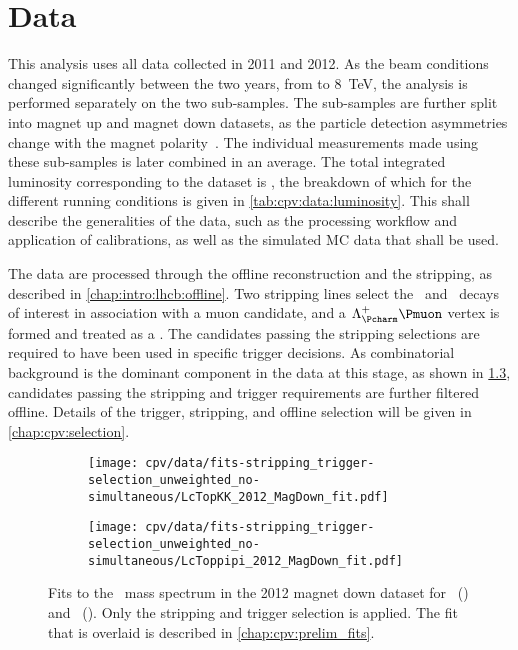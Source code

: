 \chapter{Data}
\label{chap:cpv:data}

This analysis uses all data collected in 2011 and 2012.
As the beam conditions changed significantly between the two years, from 
 to \SI{8}{\TeV}, the analysis is performed separately on the two 
sub-samples.
The sub-samples are further split into magnet up and magnet down datasets, as 
the particle detection asymmetries change with the magnet 
polarity~\cite{Vesterinen:1642153}.
The individual measurements made using these sub-samples is later combined in 
an average.
The total integrated luminosity corresponding to the dataset is \totlumi, the 
breakdown of which for the different running conditions is given in 
\cref{tab:cpv:data:luminosity}.
This  shall describe the generalities of the data, such 
as the processing workflow and application of calibrations, as well as the 
simulated \ac{MC} data that shall be used.

The data are processed through the offline reconstruction and the stripping, as 
described in \cref{chap:intro:lhcb:offline}.
Two stripping lines select the \LcTopKK\ and \LcToppipi\ decays of interest in 
association with a muon candidate, and a $\PLambdac\Pmuon$ vertex is formed and 
treated as a \PLambdab.
The candidates passing the stripping selections are required to have been used 
in specific trigger decisions.
As combinatorial background is the dominant component in the data at this 
stage, as shown in \cref{fig:cpv:data:mass}, candidates passing the stripping 
and trigger requirements are further filtered offline.
Details of the trigger, stripping, and offline selection will be given in 
\cref{chap:cpv:selection}.

\begin{figure}
  \begin{subfigure}[b]{0.5\textwidth}
    \texttt{[image: cpv/data/fits-stripping\_trigger-selection\_unweighted\_no-simultaneous/LcTopKK\_2012\_MagDown\_fit.pdf]}
    \caption{\pKK}
    \label{fig:cpv:data:mass:pKK}
  \end{subfigure}
  \begin{subfigure}[b]{0.5\textwidth}
    \texttt{[image: cpv/data/fits-stripping\_trigger-selection\_unweighted\_no-simultaneous/LcToppipi\_2012\_MagDown\_fit.pdf]}
    \caption{\ppipi}
    \label{fig:cpv:data:mass:ppipi}
  \end{subfigure}
  \caption{%
    Fits to the \PLambdac\ mass spectrum in the 2012 magnet down dataset for 
    \pKK\ () and \ppipi\ 
    ().
    Only the stripping and trigger selection is applied.
    The fit that is overlaid is described in \cref{chap:cpv:prelim_fits}.
  }
  \label{fig:cpv:data:mass}
\end{figure}


